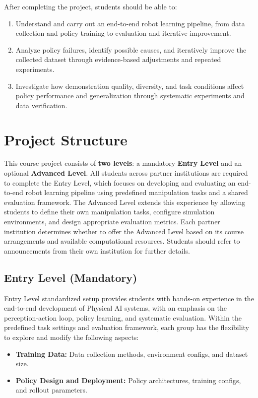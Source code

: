 \documentclass[11pt]{article}
\begin{document}
After completing the project, students should be able to:
\begin{enumerate}
  \item Understand and carry out an end-to-end robot learning pipeline, from data collection and policy training to evaluation and iterative improvement.
  \item Analyze policy failures, identify possible causes, and iteratively improve the collected dataset through evidence-based adjustments and repeated experiments.
  \item Investigate how demonstration quality, diversity, and task conditions affect policy performance and generalization through systematic experiments and data verification.
\end{enumerate}


\section{Project Structure}
This course project consists of \textbf{two levels}: a mandatory \textbf{Entry Level} and an optional \textbf{Advanced Level}. All students across partner institutions are required to complete the Entry Level, which focuses on developing and evaluating an end-to-end robot learning pipeline using predefined manipulation tasks and a shared evaluation framework. The Advanced Level extends this experience by allowing students to define their own manipulation tasks, configure simulation environments, and design appropriate evaluation metrics. Each partner institution determines whether to offer the Advanced Level based on its course arrangements and available computational resources. Students should refer to announcements from their own institution for further details.


\subsection{Entry Level (Mandatory)}

Entry Level standardized setup provides students with hands-on experience in the end-to-end development of Physical AI systems, with an emphasis on the perception-action loop, policy learning, and systematic evaluation. Within the predefined task settings and evaluation framework, each group has the flexibility to explore and modify the following aspects:

\begin{itemize}
  \item \textbf{Training Data:} Data collection methods, environment configs, and dataset size.
  \item \textbf{Policy Design and Deployment:} Policy architectures, training configs, and rollout parameters.
\end{itemize}
\end{document}
